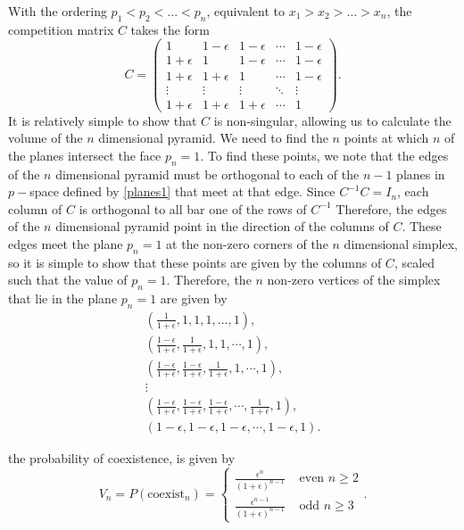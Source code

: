 With the ordering $p_1<p_2<\dots<p_n$, equivalent to $x_1>x_2>\dots>x_n$, the competition matrix $C$ takes the form
\begin{equation}
\label{constant_C}
C=\begin{pmatrix}
1 & 1-\epsilon &1-\epsilon & \cdots & 1-\epsilon \\
1+\epsilon&1&1-\epsilon&\cdots&1-\epsilon \\
1+\epsilon&1+\epsilon&1&\cdots&1-\epsilon \\
\vdots&\vdots&\vdots&\ddots&\vdots \\
1+\epsilon&1+\epsilon&1+\epsilon&\cdots&1 \end{pmatrix}.
\end{equation}
It is relatively simple to show that $C$ is non-singular, allowing us to calculate the volume of the $n$ dimensional pyramid. We need to find the $n$ points at which $n$ of the planes intersect the face $p_n=1$. To find these points, we note that the edges of the $n$ dimensional pyramid must be orthogonal to each of the $n-1$  planes in $p-$space defined by \eqref{planes1} that meet at that edge. Since $C^{-1}C=I_n$, each column of $C$ is orthogonal to all bar one of the rows of $C^{-1}$ Therefore, the edges of the $n$ dimensional pyramid point in the direction of the columns of $C$. These edges meet the plane $p_n=1$ at the non-zero corners of the $n$ dimensional simplex, so it is simple to show that these points are given by the columns of $C$, scaled such that the value of $p_n=1$. Therefore, the $n$ non-zero vertices of the  simplex that lie in the plane $p_n=1$ are given by
\begin{gather*}
\left(\frac{1}{1+\epsilon},1,1,1,\dots, 1\right), \\
\left(\frac{1-\epsilon}{1+\epsilon}, \frac{1}{1+\epsilon}, 1, 1,\cdots, 1\right), \\
\left(\frac{1-\epsilon}{1+\epsilon}, \frac{1-\epsilon}{1+\epsilon},\frac{1}{1+\epsilon}, 1,\cdots, 1\right), \\
\vdots \\
\left(\frac{1-\epsilon}{1+\epsilon}, \frac{1-\epsilon}{1+\epsilon},\frac{1-\epsilon}{1+\epsilon},\cdots, \frac{1}{1+\epsilon},1\right), \\
\left(1-\epsilon, 1-\epsilon,1-\epsilon,\cdots, 1-\epsilon,1\right).
\end{gather*}
\begin{thm} the  probability of coexistence, is given by
\begin{equation}
\label{nspecies}
V_n=P(\text{coexist}_n)=\begin{cases}
\frac{\epsilon^n}{(1+\epsilon)^{n-1}} &  \mbox{ even }n\geq 2 \\
\frac{\epsilon^{n-1}}{(1+\epsilon)^{n-1}} &   \mbox{ odd }n\geq 3 \end{cases}.
\end{equation} \end{thm}
